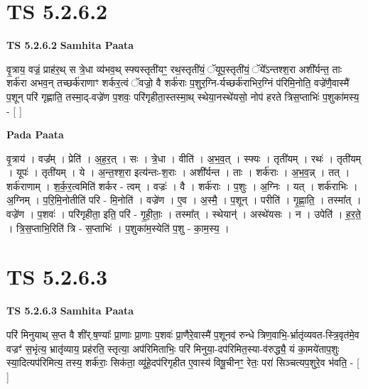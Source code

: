 \documentclass[17pt]{extarticle}
\begin{document}
\section*{ TS 5.2.6.2 }

\textbf{TS 5.2.6.2 } \newline
\textbf{Samhita Paata} \newline

वृ॒त्राय॒ वज्रं॒ प्राह॑र॒थ् स त्रे॒धा व्य॑भव॒थ् स्फ्यस्तृती॑यꣳ॒॒ रथ॒स्तृती॑यं॒ ॅयूप॒स्तृती॑यं॒ ॅये᳚ऽन्तश्श॒रा अशी᳚र्यन्त॒ ताः शर्क॑रा अभव॒न् तच्छर्क॑राणाꣳ शर्कर॒त्वं ॅवज्रो॒ वै शर्क॑राः प॒शुर॒ग्नि-र्यच्छर्क॑राभिर॒ग्निं प॑रिमि॒नोति॒ वज्रे॑णै॒वास्मै॑ प॒शून् परि॑ गृह्णाति॒ तस्मा॒द्-वज्रे॑ण प॒शवः॒ परि॑गृहीता॒स्तस्मा॒थ् स्थेया॒नस्थे॑यसो॒ नोप॑ हरते त्रिस॒प्ताभिः॑ प॒शुका॑मस्य॒ - [  ] \newline

\textbf{Pada Paata} \newline

वृ॒त्राय॑ । वज्र᳚म् । प्रेति॑ । अ॒ह॒र॒त् । सः । त्रे॒धा । वीति॑ । अ॒भ॒व॒त् । स्फ्यः । तृती॑यम् । रथः॑ । तृती॑यम् । यूपः॑ । तृती॑यम् । ये । अ॒न्त॒श्श॒रा इत्य॑न्तः-श॒राः । अशी᳚र्यन्त । ताः । शर्क॑राः । अ॒भ॒व॒न्न् । तत् । शर्क॑राणाम् । श॒र्क॒र॒त्वमिति॑ शर्कर - त्वम् । वज्रः॑ । वै । शर्क॑राः । प॒शुः । अ॒ग्निः । यत् । शर्क॑राभिः । अ॒ग्निम् । प॒रि॒मि॒नोतीति॑ परि - मि॒नोति॑ । वज्रे॑ण । ए॒व । अ॒स्मै॒ । प॒शून् । परीति॑ । गृ॒ह्णा॒ति॒ । तस्मा᳚त् । वज्रे॑ण । प॒शवः॑ । परि॑गृहीता॒ इति॒ परि॑ - गृ॒ही॒ताः॒ । तस्मा᳚त् । स्थेयान्॑ । अस्थे॑यसः । न । उपेति॑ । ह॒र॒ते॒ । त्रि॒स॒प्ताभि॒रिति॑ त्रि - स॒प्ताभिः॑ । प॒शुका॑म॒स्येति॑ प॒शु - का॒म॒स्य॒ ।  \newline




\section*{ TS 5.2.6.3 }

\textbf{TS 5.2.6.3 } \newline
\textbf{Samhita Paata} \newline

परि॑ मिनुयाथ् स॒प्त वै शी॑र्.ष॒ण्याः᳚ प्रा॒णाः प्रा॒णाः प॒शवः॑ प्रा॒णैरे॒वास्मै॑ प॒शूनव॑ रुन्धे त्रिण॒वाभि॒-र्भ्रातृ॑व्यवत-स्त्रि॒वृत॑मे॒व वज्रꣳ॑ स॒भृंत्य॒ भ्रातृ॑व्याय॒ प्रह॑रति॒ स्तृत्या॒ अप॑रिमिताभिः॒ परि॑ मिनुया॒-दप॑रिमित॒स्या-व॑रुद्ध्यै॒ यं का॒मये॑ताप॒शुः स्या॒दित्यप॑रिमित्य॒ तस्य॒ शर्क॑राः॒ सिक॑ता॒ व्यू॑हे॒दप॑रिगृहीत ए॒वास्य॑ विषू॒चीनꣳ॒॒ रेतः॒ परा॑ सिञ्चत्यप॒शुरे॒व भ॑वति॒ - [  ] \newline
\end{document}
